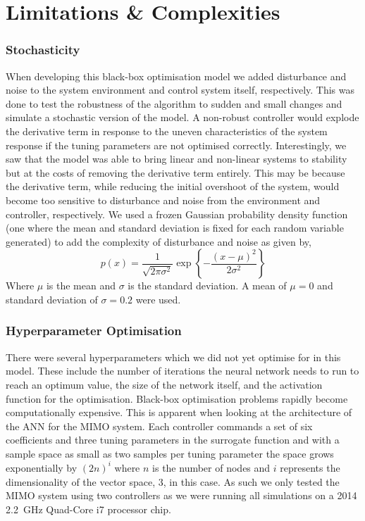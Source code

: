 \documentclass[conference]{IEEEtran}
\theoremstyle{definition}
\begin{document}
\section{Limitations \& Complexities}
\subsubsection{Stochasticity}
\noindent When developing this black-box optimisation model we added disturbance and noise to the system environment and control system itself, respectively. This was done to test the robustness of the algorithm to sudden and small changes and simulate a stochastic version of the model. A non-robust controller would explode the derivative term in response to the uneven characteristics of the system response if the tuning parameters are not optimised correctly. Interestingly, we saw that the model was able to bring linear and non-linear systems to stability but at the costs of removing the derivative term entirely. This may be because the derivative term, while reducing the initial overshoot of the system, would become too sensitive to disturbance and noise from the environment and controller, respectively. We used a frozen Gaussian probability density function (one where the mean and standard deviation is fixed for each random variable generated) to add the complexity of disturbance and noise as given by,
\begin{equation}
    p(x) = \frac{1}{\sqrt{2\pi \sigma^2}} \exp{\left\{-\frac{ (x-\mu)^2}{2\sigma^2} \right\}}
\end{equation}
\vspace{1mm}
\noindent Where $\mu$ is the mean and $\sigma$ is the standard deviation. A mean of $\mu=0$ and standard deviation of $\sigma=0.2$ were used. 
\vspace{3mm}
\subsubsection{Hyperparameter Optimisation}
There were several hyperparameters which we did not yet optimise for in this model. These include the number of iterations the neural network needs to run to reach an optimum value, the size of the network itself, and the activation function for the optimisation. Black-box optimisation problems rapidly become computationally expensive. This is apparent when looking at the architecture of the ANN for the MIMO system. Each controller commands a set of six coefficients and three tuning parameters in the surrogate function and with a sample space as small as two samples per tuning parameter the space grows exponentially by $(2n)^i$ where $n$ is the number of nodes and $i$ represents the dimensionality of the vector space, 3, in this case. As such we only tested the MIMO system using two controllers as we were running all simulations on a 2014 \SI{2.2}{GHz} Quad-Core i7 processor chip. 
\end{document}
